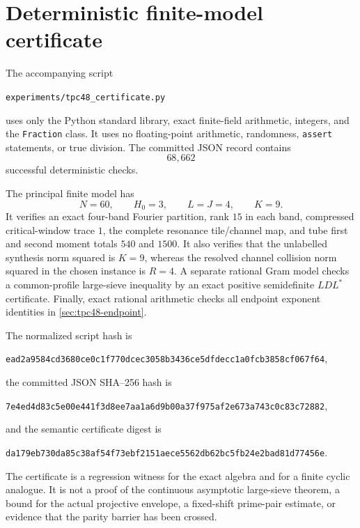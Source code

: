 \section{Deterministic finite-model certificate}
\label{sec:tpc48-certificate}

The accompanying script
\begin{center}
\texttt{experiments/tpc48\_certificate.py}
\end{center}
uses only the Python standard library, exact finite-field arithmetic,
integers, and the \texttt{Fraction} class.  It uses no floating-point
arithmetic, randomness, \texttt{assert} statements, or true division.
The committed JSON record contains
\begin{equation}
 68{,}662
 \label{eq:tpc48-certificate-check-count}
\end{equation}
successful deterministic checks.

The principal finite model has
\begin{equation}
 N=60,
 \qquad H_0=3,
 \qquad L=J=4,
 \qquad K=9.
 \label{eq:tpc48-certificate-parameters}
\end{equation}
It verifies an exact four-band Fourier partition, rank \(15\) in each
band, compressed critical-window trace \(1\), the complete resonance
tile/channel map, and tube first and second moment totals \(540\) and
\(1500\).  It also verifies that the unlabelled synthesis norm squared
is \(K=9\), whereas the resolved channel collision norm squared in the
chosen instance is \(R=4\).  A separate rational Gram model checks a
common-profile large-sieve inequality by an exact positive
semidefinite \(LDL^\ast\) certificate.  Finally, exact rational
arithmetic checks all endpoint exponent identities in
\cref{sec:tpc48-endpoint}.

The normalized script hash is
\begin{center}
\texttt{ead2a9584cd3680ce0c1f770dcec3058b3436ce5dfdecc1a0fcb3858cf067f64},
\end{center}
the committed JSON SHA--256 hash is
\begin{center}
\texttt{7e4ed4d83c5e00e441f3d8ee7aa1a6d9b00a37f975af2e673a743c0c83c72882},
\end{center}
and the semantic certificate digest is
\begin{center}
\texttt{da179eb730da85c38af54f73ebf2151aece5562db62bc5fb24e2bad81d77456e}.
\end{center}

The certificate is a regression witness for the exact algebra and for
a finite cyclic analogue.  It is not a proof of the continuous
asymptotic large-sieve theorem, a bound for the actual projective
envelope, a fixed-shift prime-pair estimate, or evidence that the
parity barrier has been crossed.
